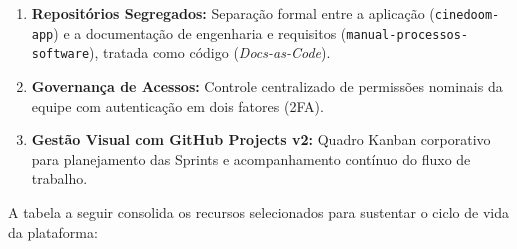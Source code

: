 \begin{enumerate}
\item \textbf{Repositórios Segregados:} Separação formal entre a aplicação (\texttt{cinedoom-\allowbreak\hspace{0pt plus 1pt}app}) e a documentação de engenharia e requisitos (\texttt{manual-\allowbreak\hspace{0pt plus 1pt}processos-\allowbreak\hspace{0pt plus 1pt}software}), tratada como código (\emph{Docs-as-Code}).
\item \textbf{Governança de Acessos:} Controle centralizado de permissões nominais da equipe com autenticação em dois fatores (2FA).
\item \textbf{Gestão Visual com GitHub Projects v2:} Quadro Kanban corporativo para planejamento das Sprints e acompanhamento contínuo do fluxo de trabalho.
\end{enumerate}




A tabela a seguir consolida os recursos selecionados para sustentar o ciclo de vida da plataforma:

